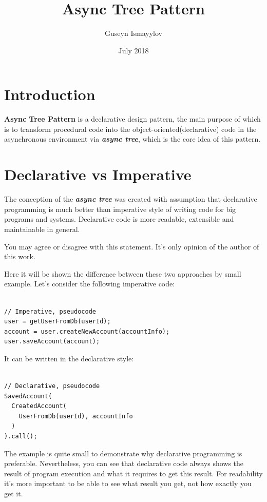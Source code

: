 \documentclass{article}
\title{Async Tree Pattern}
\author{Guseyn Ismayylov}
\date{July 2018}
\newcommand{\bit}[1]{\textit{\textbf{#1}}}
\begin{document}
\maketitle

\section{Introduction}

\textbf{Async Tree Pattern} is a declarative design pattern, the main purpose of which is to transform procedural code into the object-oriented(declarative) code in the asynchronous environment via \bit{async tree}, which is the core idea of this pattern.

\section{Declarative vs Imperative}

The conception of the \bit{async tree} was created with assumption that declarative programming is much better than imperative style of writing code for big programs and systems. Declarative code is more readable, extensible and maintainable in general.

You may agree or disagree with this statement. It's only opinion of the author of this work.

Here it will be shown the difference between these two approaches by small example. Let's consider the following imperative code:  

\begin{lstlisting}

// Imperative, pseudocode
user = getUserFromDb(userId);
account = user.createNewAccount(accountInfo);
user.saveAccount(account);

\end{lstlisting}

It can be written in the declarative style:

\begin{lstlisting}

// Declarative, pseudocode
SavedAccount(
  CreatedAccount(
    UserFromDb(userId), accountInfo
  )
).call();

\end{lstlisting}

The example is quite small to demonstrate why declarative programming is preferable. Nevertheless, you can see that declarative code always shows the result of program execution and what it requires to get this result. For readability it's more important to be able to see what result you get, not how exactly you get it.
\end{document}
